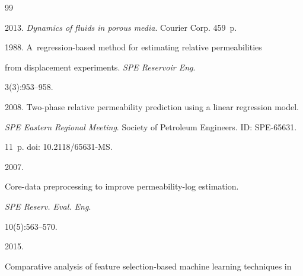 \renewcommand{\bibname}{\protect\rmfamily References}




{\small\frenchspacing

{%


\begin{thebibliography}{99}




 2013. \textit{Dynamics of fluids in porous media}. Courier Corp. 459~p.









1988. A~regression-based method for estimating relative permeabilities 

from displacement experiments. \textit{SPE Reservoir Eng}. 

3(3):953--958.





2008. Two-phase relative permeability prediction using a linear regression model. 

\textit{SPE Eastern Regional Meeting}. Society of Petroleum Engineers. ID: SPE-65631. 

11~p. doi: 10.2118/65631-MS.




 2007. 

Core-data preprocessing to improve permeability-log estimation. 

\textit{SPE Reserv. Eval. Eng}. 

 10(5):563--570.

    


 2015. 

Comparative analysis of feature selection-based machine learning techniques in 


\end{thebibliography}}}
